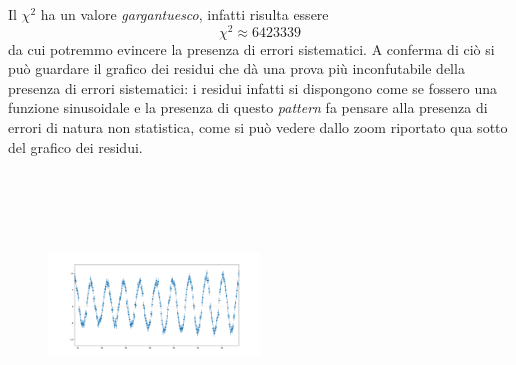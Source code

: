 \documentclass{article}
\begin{document}
Il $\chi^2$ ha un valore \emph{gargantuesco}, infatti risulta essere
$$
	\chi^2 \approx 6423339
$$
da cui potremmo evincere la presenza di errori sistematici. A conferma di ciò si può guardare il grafico dei residui che dà una prova più inconfutabile della presenza di errori sistematici: i residui infatti si dispongono come se fossero una funzione sinusoidale e la presenza di questo \emph{pattern} fa pensare alla presenza di errori di natura non statistica, come si può vedere dallo zoom riportato qua sotto del grafico dei residui.

\begin{figure}
	\includegraphics[width=0.5\textwidth, height=200pt]{Zoom_residui.png}
\end{figure}
\end{document}
